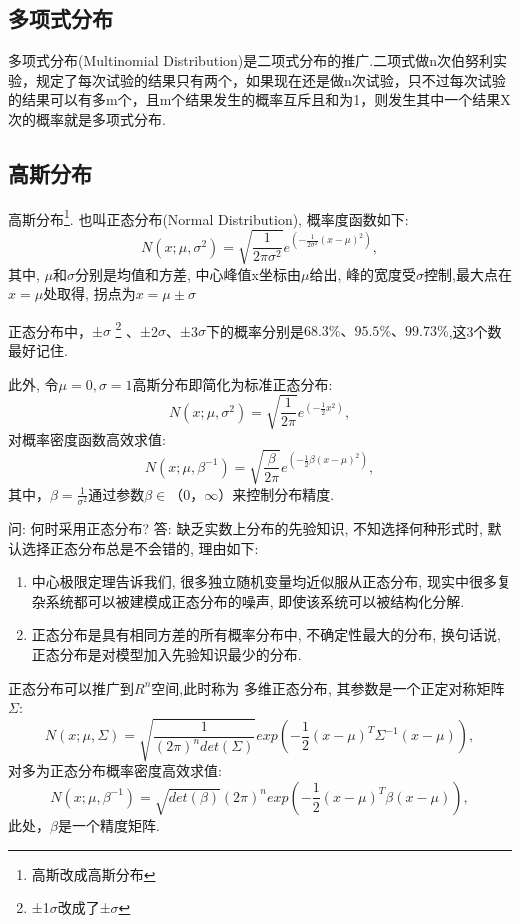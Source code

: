 \subsection{多项式分布}
多项式分布(Multinomial
Distribution)是二项式分布的推广.二项式做n次伯努利实验，规定了每次试验的结果只有两个，如果现在还是做n次试验，只不过每次试验的结果可以有多m个，且m个结果发生的概率互斥且和为1，则发生其中一个结果X次的概率就是多项式分布.
\subsection{ 高斯分布}
\label{ux9ad8ux65afux5206ux5e03}
高斯分布\footnote{高斯改成高斯分布}.
也叫正态分布(Normal Distribution), 概率度函数如下:
\[
N(x;\mu,\sigma^2) = \sqrt{\frac{1}{2\pi\sigma^2}}e ^{\left ( -\frac{1}{2\sigma^2}(x-\mu)^2 \right )},
\]
其中, \(\mu​\)和\(\sigma​\)分别是均值和方差,
中心峰值x坐标由\(\mu​\)给出, 峰的宽度受\(\sigma​\)控制,最大点在\(x=\mu​\)处取得, 拐点为\(x=\mu\pm\sigma​\)

正态分布中，±\(\sigma\)
\footnote{±1\(\sigma\)改成了±\(\sigma\)}
、±2\(\sigma\)、±3\(\sigma\)下的概率分别是$68.3\%、95.5\%、99.73\%$,这3个数最好记住.

此外, 令\(\mu=0,\sigma=1​\)高斯分布即简化为标准正态分布:
\[
N(x;\mu,\sigma^2) = \sqrt{\frac{1}{2\pi}}e^{\left ( -\frac{1}{2}x^2 \right )},
\]
对概率密度函数高效求值:
\[
N(x;\mu,\beta^{-1})=\sqrt{\frac{\beta}{2\pi}}e^{\left(-\frac{1}{2}\beta(x-\mu)^2\right)},
\]
其中，\(\beta=\frac{1}{\sigma^2}\)通过参数\(\beta∈（0，\infty）​\)来控制分布精度.
\begin{remark}
问: 何时采用正态分布? 答: 缺乏实数上分布的先验知识, 不知选择何种形式时,
默认选择正态分布总是不会错的, 理由如下:
\begin{enumerate}
\def\labelenumi{\arabic{enumi}.}
 
\item
  中心极限定理告诉我们, 很多独立随机变量均近似服从正态分布,
  现实中很多复杂系统都可以被建模成正态分布的噪声,
  即使该系统可以被结构化分解.
\item
  正态分布是具有相同方差的所有概率分布中, 不确定性最大的分布, 换句话说,
  正态分布是对模型加入先验知识最少的分布.
\end{enumerate}  
\end{remark}

正态分布可以推广到\(R^n\)空间,此时称为 {多维正态分布}, 其参数是一个正定对称矩阵\(\Sigma​\):
\[
N(x; \mu,\Sigma)=\sqrt{\frac{1}{(2\pi)^ndet(\Sigma)}}exp\left(-\frac{1}{2}( {x}- {\mu})^T\Sigma^{-1}( {x}- {\mu})\right),
\] 对多为正态分布概率密度高效求值: \[
N(x; {\mu}, \beta^{-1}) = \sqrt{det( \beta)}{(2\pi)^n}exp\left(-\frac{1}{2}( {x}- \mu)^T\beta( {x}- \mu)\right),
\] 此处，\( \beta\)是一个精度矩阵.

